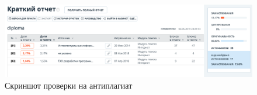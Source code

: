 \newpage
{}
\label{app:antiplagiat}

~
\begin{figure}[H]
\centering
	\includegraphics[scale=0.35]{figures/antiplagiat.png}
	\caption{Скриншот проверки на антиплагиат}
	\label{fig:appendices:antiplagiat:antiplagiat}
\end{figure}